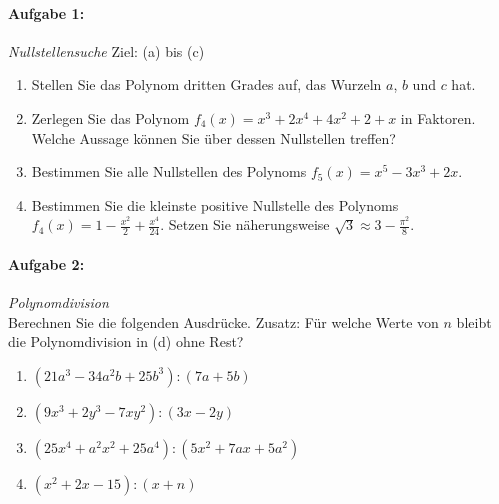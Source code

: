 
\paragraph{Aufgabe 1: } \emph{Nullstellensuche} \hfill Ziel: (a) bis (c)\\[-4mm]
\begin{enumerate}[label=(\alph*), labelindent=1em,labelsep=0.5cm]
    \item Stellen Sie das Polynom dritten Grades auf, das Wurzeln $a$, $b$ und $c$ hat.
    \item Zerlegen Sie das Polynom $f_4(x)=x^3+2x^4+4x^2+2+x$ in Faktoren. Welche Aussage können Sie über dessen Nullstellen treffen?
    \item Bestimmen Sie alle Nullstellen des Polynoms $f_5(x)=x^5-3x^3+2x$.
    \item Bestimmen Sie die kleinste positive Nullstelle des Polynoms $\displaystyle f_4(x)=1-\frac{x^2}{2}+\frac{x^4}{24}$. Setzen Sie näherungsweise $\displaystyle \sqrt{3}\approx 3-\frac{\pi^2}{8}$.
\end{enumerate}

\paragraph{Aufgabe 2: } \emph{Polynomdivision}\\[0.2cm]
Berechnen Sie die folgenden Ausdrücke. Zusatz: Für welche Werte von $n$ bleibt die Polynomdivision in (d) ohne Rest?
\begin{multicols}{2}
    \begin{enumerate}[label=(\alph*), labelindent=1em,labelsep=0.5cm]
        \item $(21a^3-34a^2b+25b^3):(7a+5b)$
        \item $(9x^3+2y^3-7xy^2):(3x-2y)$
        \item $(25x^4+a^2x^2+25a^4):(5x^2+7ax+5a^2)$
        \item $(x^2+2x-15):(x+n)$
    \end{enumerate}
\end{multicols}

